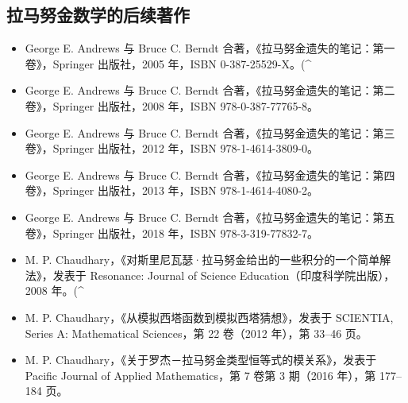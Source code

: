 \subsection{拉马努金数学的后续著作}
\begin{itemize}
\item George E. Andrews 与 Bruce C. Berndt 合著，《拉马努金遗失的笔记：第一卷》，Springer 出版社，2005 年，ISBN 0-387-25529-X。(^\text{[164]}\)
\item George E. Andrews 与 Bruce C. Berndt 合著，《拉马努金遗失的笔记：第二卷》，Springer 出版社，2008 年，ISBN 978-0-387-77765-8。
\item George E. Andrews 与 Bruce C. Berndt 合著，《拉马努金遗失的笔记：第三卷》，Springer 出版社，2012 年，ISBN 978-1-4614-3809-0。
\item George E. Andrews 与 Bruce C. Berndt 合著，《拉马努金遗失的笔记：第四卷》，Springer 出版社，2013 年，ISBN 978-1-4614-4080-2。
\item George E. Andrews 与 Bruce C. Berndt 合著，《拉马努金遗失的笔记：第五卷》，Springer 出版社，2018 年，ISBN 978-3-319-77832-7。
\item M. P. Chaudhary，《对斯里尼瓦瑟·拉马努金给出的一些积分的一个简单解法》，发表于 Resonance: Journal of Science Education（印度科学院出版），2008 年。(^\text{[165]}\)
\item M. P. Chaudhary，《从模拟西塔函数到模拟西塔猜想》，发表于 SCIENTIA, Series A: Mathematical Sciences，第 22 卷（2012 年），第 33–46 页。
\item M. P. Chaudhary，《关于罗杰－拉马努金类型恒等式的模关系》，发表于 Pacific Journal of Applied Mathematics，第 7 卷第 3 期（2016 年），第 177–184 页。
\end{itemize}
